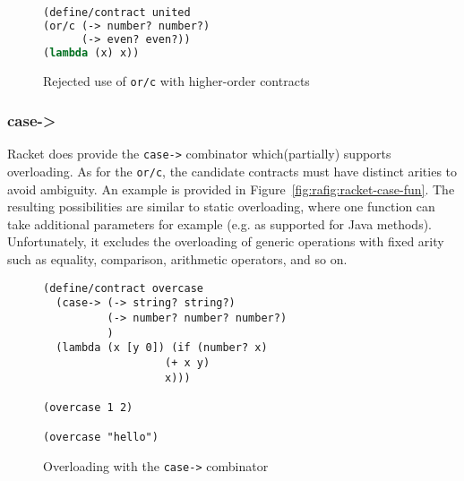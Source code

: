 \documentclass[sigplan,10pt,review,anonymous]{acmart}
\newcommand{\unsure}[2][1=]{}
\newcommand{\racket}[1]{\lstinline[language=racket]{#1}}
\begin{document}
\begin{figure}[h]

\begin{lstlisting}[language=lisp]
(define/contract united
(or/c (-> number? number?)
      (-> even? even?))
(lambda (x) x))
\end{lstlisting}
\caption{Rejected use of \racket{or/c} with higher-order contracts}
\label{code:racket:or/c:non-working}

\end{figure}


\unsure{This section is overall a bit hard to follow. I
  think I've figured out what it means, but it needs more love. Also
  give an example which doesn't work and one that does for or/c.}

\subsubsection{case->}

Racket does provide the \racket{case->} combinator which(partially) supports
overloading. As for the \racket{or/c}, the candidate contracts must have
distinct arities to avoid ambiguity. An example is provided in
Figure~\ref{fig:rafig:racket-case-fun}. The resulting possibilities are similar
to static overloading, where one function can take additional parameters for
example (e.g. as supported for Java methods). Unfortunately, it excludes the
overloading of generic operations with fixed arity such as equality, comparison,
arithmetic operators, and so on.


\begin{figure}[h]
\begin{lstlisting}[language=racket]
(define/contract overcase
  (case-> (-> string? string?)
          (-> number? number? number?)
          )
  (lambda (x [y 0]) (if (number? x)
                   (+ x y)
                   x)))

(overcase 1 2)

(overcase "hello")
\end{lstlisting}
\caption{Overloading with the \racket{case->} combinator}
\label{fig:racket-case-fun}
\end{figure}
\end{document}
